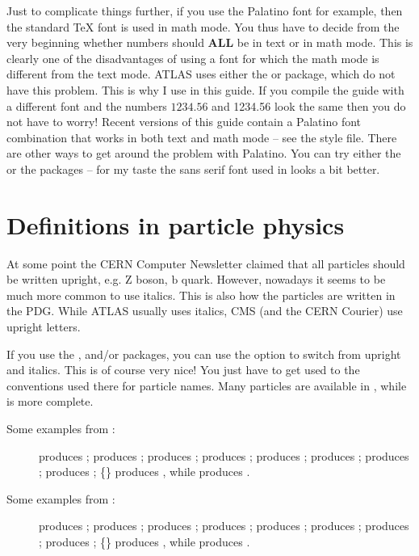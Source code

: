 Just to complicate things further, if you use the Palatino font for
example, then the standard \TeX{} font is used in math mode. You thus
have to decide from the very beginning whether numbers should
\textbf{ALL} be in text or in math mode. This is clearly one of the
disadvantages of using a font for which the math mode is different
from the text mode. ATLAS uses either the  or  package,
which do not have this problem. 
This is why I use  in this guide. 
If you compile the guide
with a different font and the numbers $1234.56$ and 1234.56 look the
same then you do not have to worry! 
Recent versions of this guide contain a Palatino font combination that works in both
text and math mode -- see the style file.
There are other ways to get around the problem with Palatino. 
You can try either the  or the
 packages -- for my taste the sans serif font used
in  looks a bit better.


\section{Definitions in particle physics}
\label{sec:tips:hepparticles}

At some point the CERN Computer Newsletter claimed that all particles should be written
upright, e.g. $\text{Z}$ boson, $\text{b}$ quark.
However, nowadays it seems to be much more common to use italics.
This is also how the particles are written in the PDG.
While ATLAS usually uses italics, CMS (and the CERN Courier) use upright letters.

If you use the ,  and/or  packages,
you can use the option  to switch from upright and italics.
This is of course very nice!
You just have to get used to the conventions used there for particle names.
Many particles are available in ,
while  is more complete.
\begin{description}
\item[Some examples from :]
   produces \Pe;
   produces \Pl;
   produces \Pqt;
   produces \PZ;
   produces \PWpm;
   produces \PBz;
   produces \PBpm;
   produces \PacB;
  \{\} produces \PBz{}\PaBz, while
   produces \PBz\PaBz.
\item[Some examples from :]
   produces \APelectron;
   produces \Plepton;
   produces \Ptop;
   produces \PZ;
   produces \PWpm;
   produces \PBzero;
   produces \PBpm;
   produces \APBc;
  \{\} produces \PBzero{}\APBzero, while
   produces \PBzero\APBzero.
\end{description}

